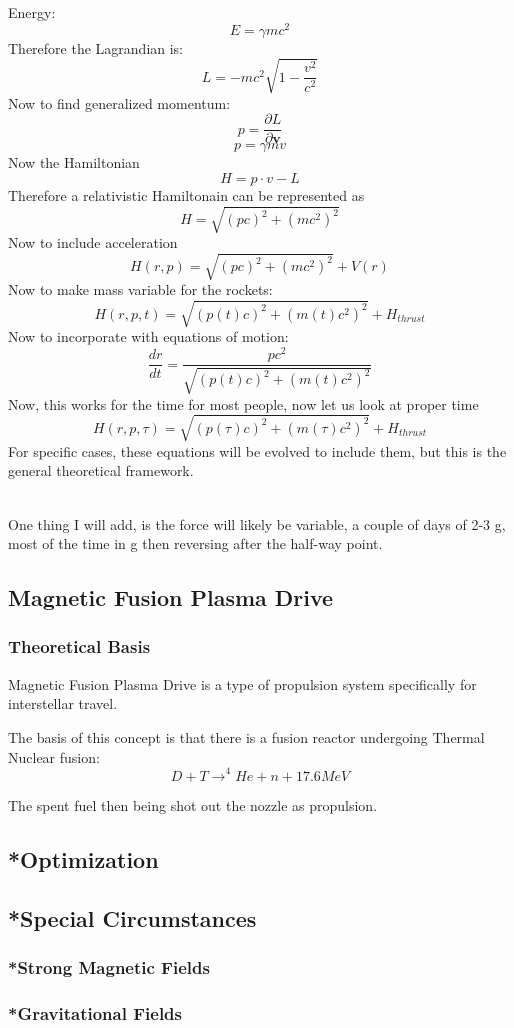 Energy:
$$E= \gamma mc^2$$
Therefore the Lagrandian is:
$$L=-mc^2\sqrt{1-\frac{v^2}{c^2}}$$
Now to find generalized momentum:
$$p=\frac{\partial L}{\partial \boldsymbol{v}}$$
$$p=\gamma m v$$
Now the Hamiltonian
$$H=p \cdot v - L$$
Therefore a relativistic Hamiltonain can be represented as
$$H=\sqrt{(pc)^2+(mc^2)^2}$$
Now to include acceleration
$$H(r,p)=\sqrt{(pc)^2+(mc^2)^2}+V(r)$$
Now to make mass variable for the rockets:
$$H(r,p,t)=\sqrt{(p(t)c)^2+(m(t)c^2)^2}+H_{thrust}$$
Now to incorporate with equations of motion:
$$\frac{dr}{dt}=\frac{pc^2}{\sqrt{(p(t)c)^2+(m(t)c^2)^2}}$$
Now, this works for the time for most people, now let us look at proper time
$$H(r,p,\tau)=\sqrt{(p(\tau)c)^2+(m(\tau)c^2)^2}+H_{thrust}$$
For specific cases, these equations will be evolved to include them, but this is the general theoretical framework.
\\ 
\\
\par One thing I will add, is the force will likely be variable, a couple of days of 2-3 g, most of the time in g then reversing after the half-way point.
\subsection{Magnetic Fusion Plasma Drive}
\subsubsection{Theoretical Basis}
\par Magnetic Fusion Plasma Drive is a type of propulsion system specifically for interstellar travel.
\par The basis of this concept is that there is a fusion reactor undergoing Thermal Nuclear fusion:
$$D+T \xrightarrow{}^4He+n+17.6MeV$$
\par The spent fuel then being shot out the nozzle as propulsion.
\subsection{*Optimization}
\subsection{*Special Circumstances}
\subsubsection{*Strong Magnetic Fields}
\subsubsection{*Gravitational Fields}


